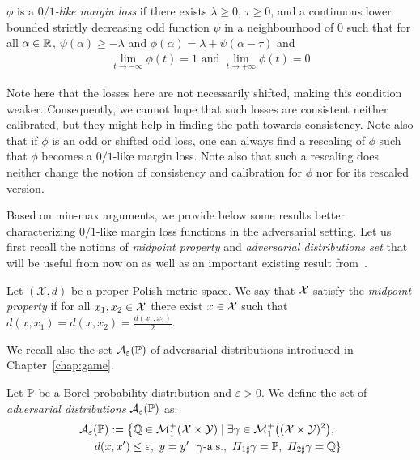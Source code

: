 \begin{definition}
\label{def:limits}
$\phi$ is a \emph{$0/1$-like margin loss} if there exists $\lambda\geq0$, $\tau\geq0$, and a continuous lower bounded strictly decreasing odd function \textcolor{black}{$\psi$} in a neighbourhood of $0$ such that for all $\alpha\in\mathbb{R}$, $\psi(\alpha)\geq -\lambda$ and $\phi(\alpha) = \lambda+\psi(\alpha-\tau)$ and
\begin{align*}
\lim_{t\to-\infty}\phi(t)=1\text{ and }\lim_{t\to+\infty}\phi(t)=0
\end{align*}
\end{definition}

Note here that the losses here are not necessarily shifted, making this condition weaker. Consequently, we cannot hope that such losses are consistent neither calibrated, but they might help in finding the path towards consistency.  Note also that if $\phi$ is an odd or shifted odd loss, one can always find a rescaling of $\phi$ such that $\phi$ becomes a $0/1$-like margin loss. Note also that such a rescaling does neither change the notion of consistency and calibration for $\phi$ nor for its rescaled version.






Based on min-max arguments, we provide below some results better characterizing $0/1$-like margin loss functions in the adversarial setting. Let us first recall the notions of \emph{midpoint property} and \emph{adversarial distributions set} that will be useful from now on as well as an important existing result from~\citet{pydi2021many}. 

\begin{definition}
Let $(\mathcal{X},d)$ be a proper Polish metric space. We say that $\mathcal{X}$ satisfy the \emph{midpoint property} if for all $x_1,x_2\in\mathcal{X}$ there exist $x\in\mathcal{X}$ such that $d(x,x_1) = d(x,x_2) =\frac{d(x_1,x_2)}{2}$.
\end{definition}
We recall also the set $\mathcal{A}_\varepsilon(\mathbb{P})$ of adversarial distributions introduced in Chapter~\ref{chap:game}.
\begin{definition}
Let $\mathbb{P}$ be a Borel probability distribution and $\varepsilon>0$.
We define the set of \emph{adversarial distributions} $\mathcal{A}_\varepsilon(\mathbb{P})$ as: 
\begin{align*}
\mathcal{A}_{\varepsilon}&(\PP) := \left\{\QQ\in\mathcal{M}^+_1(\mathcal{X}\times\mathcal{Y})\mid\exists \gamma\in\mathcal{M}^+_1\left((\mathcal{X}\times\mathcal{Y})^2\right),\right.\\
&\left.d(x,x')\leq\varepsilon,~y=y'~~ \gamma\text{-a.s.},~\Pi_{1\sharp}\gamma=\PP,~\Pi_{2\sharp}\gamma=\QQ\right\} 
\end{align*}

\end{definition}


